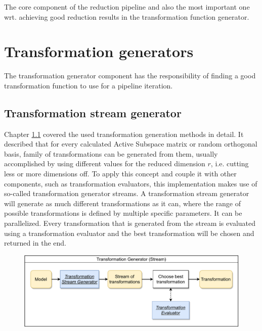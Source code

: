 \documentclass[
  a4paper,  %
  twoside,  %
  bibliography=totoc,
  headsepline,
  cleardoublepage=empty,
  parskip=half,
  draft=false
]{scrbook}
\begin{document}
The core component of the reduction pipeline and also the most important one wrt. achieving good reduction results in the transformation function generator.

\newpage
\section {Transformation generators}
\label{sec:tg}

The transformation generator component has the responsibility of finding a good transformation function to use for a pipeline iteration.

\subsection {Transformation stream generator}

Chapter \ref{} covered the used transformation generation methods in detail.
It described that for every calculated Active Subspace matrix or random orthogonal basis, family of transformations can be generated from them, usually accomplished by using different values for the reduced dimension $r$, i.e. cutting less or more dimensions off.
To apply this concept and couple it with other components, such as transformation evaluators, this implementation makes use of so-called transformation generator streams.
A transformation stream generator will generate as much different transformations as it can, where the range of possible transformations is defined by multiple specific parameters.
It can be parallelized.
Every transformation that is generated from the stream is evaluated using a transformation evaluator and the best transformation will be chosen and returned in the end.

\begin{figure}[H]
\includegraphics[width=\textwidth]{graphics/TransformationGen_Stream.pdf}
\end{figure}
\end{document}

